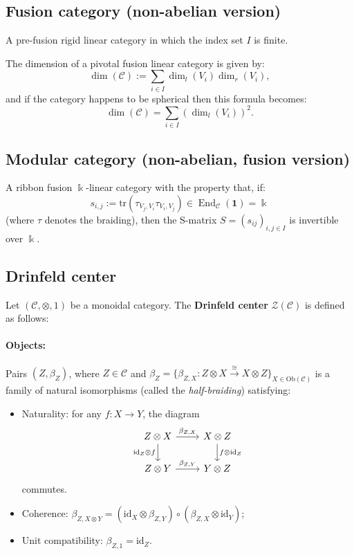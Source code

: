 \documentclass[11pt]{article}
\theoremstyle{definition}
\begin{document}
\subsection{Fusion category (non-abelian version)}
A pre-fusion rigid linear category in which the index set \( I \) is finite.

The dimension of a pivotal fusion linear category is given by:
\[
\dim (\mathcal{C}) := \sum_{i \in I} \dim_l (V_i) \dim_r (V_i),
\]
and if the category happens to be spherical then this formula becomes:
\[
\dim (\mathcal{C}) = \sum_{i \in I} (\dim_l (V_i))^2.
\]



\subsection{Modular category (non-abelian, fusion version)}
A ribbon fusion \( \Bbbk \)-linear category with the property that, if:
\[
s_{i,j} := \mathrm{tr}(\tau_{V_j,V_i} \tau_{V_i,V_j}) \in \operatorname{End}_{\mathcal{C}}(\mathbf{1}) = \Bbbk
\]
(where \( \tau \) denotes the braiding), then the S-matrix \( S = (s_{ij})_{i,j \in I} \) is invertible over \( \Bbbk \).

\subsection{Drinfeld center}
Let \( (\mathcal{C}, \otimes, 1) \) be a monoidal category. The \textbf{Drinfeld center} \( \mathcal{Z}(\mathcal{C}) \) is defined as follows:

\paragraph{Objects:} Pairs \( (Z, \beta_Z) \), where \( Z \in \mathcal{C} \) and \( \beta_Z = \{ \beta_{Z,X} : Z \otimes X \xrightarrow{\cong} X \otimes Z \}_{X \in \text{Ob}(\mathcal{C})} \) is a family of natural isomorphisms (called the \emph{half-braiding}) satisfying:
\begin{itemize}
  \item Naturality: for any \( f: X \to Y \), the diagram
  \[
  \begin{tikzcd}
  Z \otimes X \arrow[r, "\beta_{Z,X}"] \arrow[d, "\text{id}_Z \otimes f"'] & X \otimes Z \arrow[d, "f \otimes \text{id}_Z"] \\
  Z \otimes Y \arrow[r, "\beta_{Z,Y}"] & Y \otimes Z
  \end{tikzcd}
  \]
  commutes.
  \item Coherence: \( \beta_{Z, X \otimes Y} = (\text{id}_X \otimes \beta_{Z,Y}) \circ (\beta_{Z,X} \otimes \text{id}_Y) \);
  \item Unit compatibility: \( \beta_{Z,1} = \text{id}_Z \).
\end{itemize}
\end{document}

